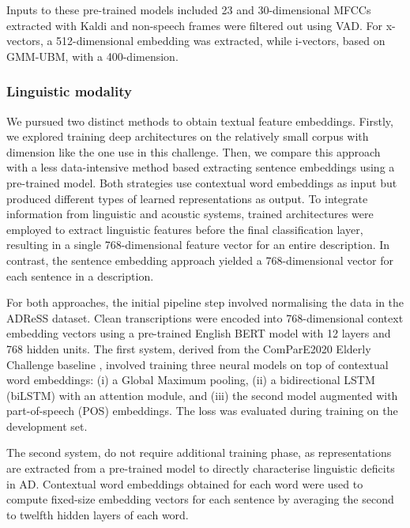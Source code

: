Inputs to these pre-trained models included 23 and 30-dimensional MFCCs extracted with Kaldi \cite{kaldi} and non-speech frames were filtered out using VAD. For x-vectors, a 512-dimensional embedding was extracted, while i-vectors, based on GMM-UBM, with a 400-dimension.
\subsubsection{Linguistic modality}
We pursued two distinct methods to obtain textual feature embeddings. Firstly, we explored training deep architectures on the relatively small corpus with dimension like the one use in this challenge. Then, we compare this approach with a less data-intensive method based extracting sentence embeddings using a pre-trained model. Both strategies use contextual word embeddings as input but produced different types of learned representations as output. To integrate information from linguistic and acoustic systems, trained architectures were employed to extract linguistic features before the final classification layer, resulting in a single 768-dimensional feature vector for an entire description. In contrast, the sentence embedding approach yielded a 768-dimensional vector for each sentence in a description.

For both approaches, the initial pipeline step involved normalising the data in the ADReSS dataset. Clean transcriptions were encoded into 768-dimensional context embedding vectors using a pre-trained English BERT model with 12 layers and 768 hidden units. The first system, derived from the ComParE2020 Elderly Challenge baseline \cite{schuller2020interspeech}, involved training three neural models on top of contextual word embeddings: (i) a Global Maximum pooling, (ii) a bidirectional LSTM (biLSTM) with an attention module, and (iii) the second model augmented with part-of-speech (POS) embeddings. The loss was evaluated during training on the development set.

The second system, do not require additional training phase, as representations are extracted from a pre-trained model to directly characterise linguistic deficits in AD. Contextual word embeddings obtained for each word were used to compute fixed-size embedding vectors for each sentence by averaging the second to twelfth hidden layers of each word.
